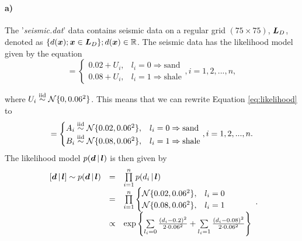 \section{}
\label{sec:p1}
\paragraph{a)}
The '\textit{seismic.dat}' data contains seismic data on a regular grid $(75\times75)$, $\bm{L}_D$, denoted as $\{d(\bm{x});\bm{x}\in \bm{L}_D\};d(\bm{x})\in \mathbb{R}$.
The seismic data has the likelihood model given by the equation
\begin{equation}
    [d_i\given\vect{l}] = \begin{cases}
                                0.02 + U_i, & l_i = 0 \Rightarrow \mathrm{sand} \\
                                0.08 + U_i, & l_i = 1 \Rightarrow \mathrm{shale}
                             \end{cases}
                            , i = 1, 2, ..., n,
    \label{eq:likelihood}
\end{equation}

where $U_i \overset{\mathrm{iid}}{\sim}\mathcal{N}\{0,0.06^2\}$. This means that we can rewrite Equation \ref{eq:likelihood} to 
\begin{equation}
    [d_i\given\vect{l}] = \begin{cases}
                                A_i\overset{\mathrm{iid}}{\sim}\N\{0.02,0.06^2\}, & l_i = 0 \Rightarrow \mathrm{sand} \\
                                B_i\overset{\mathrm{iid}}{\sim}\N\{0.08,0.06^2\}, & l_i = 1 \Rightarrow \mathrm{shale}
                             \end{cases}
                            , i = 1, 2, ..., n.
    \label{eq:likelihood2}
\end{equation}
The likelihood model $p(\bm{d}\, | \, \bm{l})$ is then given by 
\begin{equation}
    \begin{array}{rcl}
        [\bm{d}\, | \, \bm{l}] \sim p(\bm{d}\, | \, \bm{l}) & = & \prod\limits_{i=1}^n p(d_i\, | \, \bm{l}) \\
         & = & \prod\limits_{i=1}^n \begin{cases}
                                        \mathcal{N}\{0.02,0.06^2\}, & l_i = 0 \\
                                        \mathcal{N}\{0.08,0.06^2\}, & l_i = 1
                                    \end{cases}\\
         & \propto & \exp\left\{\sum\limits_{l_i = 0} \frac{(d_i - 0.2)^2}{2\cdot 0.06^2} + \sum\limits_{l_i = 1} \frac{(d_i - 0.08)^2}{2\cdot 0.06^2}\right\}
    \end{array}.
    \label{eq:likelihood3}
\end{equation}

